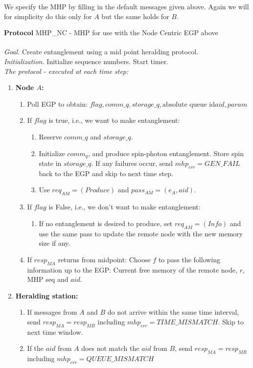 \documentclass{article}
\makeatletter
\newcounter{Lprotocol}
\newenvironment{Lprotocol}[1]
  {\par\addvspace{\topsep}
   \noindent
   \tabularx{\linewidth}{@{} X @{}}
    \hline
    \refstepcounter{Lprotocol}\textbf{Protocol \theLprotocol} #1 \\
    \hline}
  { \\
    \hline
   \endtabularx
   \par\addvspace{\topsep}}
\newcommand{\sbline}{\\[.5\normalbaselineskip]}%
\makeatother
\begin{document}
We specify the MHP by filling in the default messages given above. Again we will for simplicity do this only for $A$ but the same holds for $B$.
\begin{Lprotocol}{MHP\_NC - MHP for use with the Node Centric EGP above}
\sbline
\textit{Goal.} Create entanglement using a mid point heralding protocol.
\sbline
\textit{Initialization.} Initialize sequence numbers. Start timer.
\sbline
\textit{The protocol - executed at each time step:}
\begin{enumerate}
    \item \textbf{Node $A$:}
	\begin{enumerate}
	  \item Poll EGP to obtain: $flag, comm\_q, storage\_q, \mbox{absolute queue id} aid, param$
	  \item If $flag$ is true, i.e., we want to make entanglement:
      \begin{enumerate}
	    \item Reserve $comm\_q$ and $storage\_q$.
	    \item Initialize $comm_q$, and produce spin-photon entanglement. Store spin state in $storage\_q$. If any failures occur, send $mhp_{err} = GEN\_FAIL$ back to the EGP and skip to next time step.
	    \item Use $req_{AM} = (Produce)$ and $pass_{AM} = (e_A, aid)$.
      \end{enumerate}
      \item If $flag$ is False, i.e., we don't want to make entanglement:
      \begin{enumerate}
        \item If no entanglement is desired to produce, set $req_{AM} = (Info)$ and use the same pass to update the remote node with the new memory size if any.
      \end{enumerate}
      \item If $resp_{MA}$ returns from midpoint: Choose $f$ to pass the following information up to the EGP: Current free memory of the remote node, $r$, MHP seq and $aid$.
	\end{enumerate}
	\item \textbf{Heralding station:}
	\begin{enumerate}
	  \item If messages from $A$ and $B$ do not arrive within the same time interval, send $resp_{MA}=resp_{MB}$ including $mhp_{err} = TIME\_MISMATCH$. Skip to next time window.
	  \item If the $aid$ from $A$ does not match the $aid$ from $B$, send $resp_{MA} = resp_{MB}$ including $mhp_{err} = QUEUE\_MISMATCH$

\end{enumerate}
\end{enumerate}
\end{Lprotocol}
\end{document}

